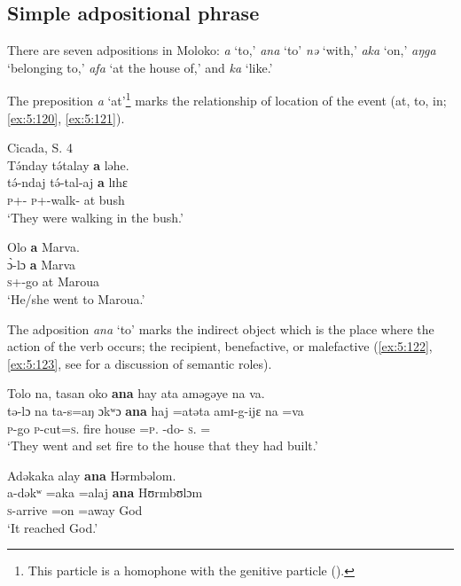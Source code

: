 \subsection{Simple adpositional phrase}\label{sec:5.6.1}
\hypertarget{RefHeading1211841525720847}{}
There are seven adpositions in Moloko: \textit{a} ‘to,’ \textit{ana} ‘to’ \textit{nə} ‘with,’ \textit{aka} ‘on,’ \textit{a}\textit{ŋ}\textit{ga} ‘belonging to,’ \textit{afa} ‘at the house of,’ and \textit{ka} ‘like.’  

The preposition \textit{a} ‘at’\footnote{This particle is a homophone with the genitive particle (). } marks the relationship of location of the event (at, to, in; \ref{ex:5:120}, \ref{ex:5:121}).


\ea \label{ex:5:120}\corpussource Cicada, S. 4\\
T\'{ə}nday  t\'{ə}talay  \textbf{a} ləhe.\\
\gll  t\'{ə}-ndaj t\'{ə}-tal-aj    \textbf{a}  lɪhɛ\\
      \textsc{p}+{\IFV}-{\PRG}  \textsc{p}+{\IFV}-walk{}-{\CL}  at  bush\\
\glt  ‘They were walking in the bush.’ 
\z

\ea \label{ex:5:121}
Olo  \textbf{a}  Marva.\\
\gll  \`{ɔ}{}-lɔ    \textbf{a}  Marva\\
      \textsc{s}+{\PFV}-go  at  Maroua\\
\glt  ‘He/she went to Maroua.’ 
\z

The adposition \textit{ana} ‘to’ marks the indirect object which is the place where the action of the verb occurs; the recipient, benefactive, or malefactive (\ref{ex:5:122}, \ref{ex:5:123}, see  for a discussion of semantic roles).

\ea \label{ex:5:122}
Tolo  na,  tasan  oko  \textbf{ana} hay  ata  aməgəye  na  va.\\
\gll  tə-lɔ    na  ta-s=aŋ    ɔkʷɔ  \textbf{ana} haj  =atəta  amɪ-g-ijɛ   na   =va\\
      \textsc{p}-go  {\PSP}  \textsc{p}-cut=\textsc{s}.{\DO}  fire  {\DAT} house  =\textsc{p}.{\POSS}   {\DEP}-do-{\CL}  \textsc{s}.{\DO}   ={\PRF}\\
\glt  ‘They went and set fire to the house that they had built.’
\z

\ea \label{ex:5:123}
Adəkaka  alay  \textbf{ana}  Hərmbəlom.\\
\gll  a-dəkʷ   =aka  =alaj  \textbf{ana}  Hʊrmbʊlɔm\\
      \textsc{s}-arrive     =on  =away  {\DAT} God\\
\glt  ‘It reached God.’
\z

